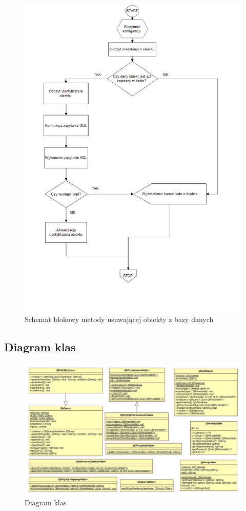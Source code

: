 \documentclass[12pt]{report}
\begin{document}
\begin{figure}[H]
\centering
\includegraphics[width=\textwidth]{resources/remove_schema.png}
\caption{Schemat blokowy metody usuwającej obiekty z bazy danych}
\end{figure}

\subsection{Diagram klas}

\newpage
\begin{figure}[H]
\centering
\includegraphics[width=\textwidth]{resources/diagram.jpeg}
\caption{Diagram klas}
\end{figure}
\end{document}
